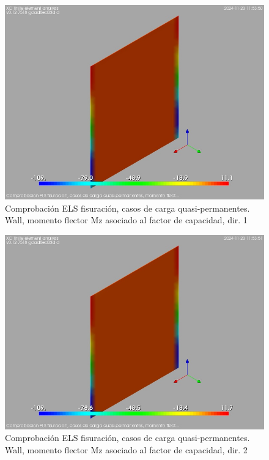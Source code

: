 \begin{figure}[ht]
\begin{center}
\includegraphics[width=\linewidth]{results/graphics/crackingSLS_qperm/wallMzSect1}
\caption{Comprobación ELS fisuración, casos de carga quasi-permanentes. Wall, momento flector Mz asociado al factor de capacidad, dir. 1}
\label{SLS_quasiPermanentLoadsCrackControlwallMzSect1}
\end{center}
\end{figure}
\begin{figure}[ht]
\begin{center}
\includegraphics[width=\linewidth]{results/graphics/crackingSLS_qperm/wallMzSect2}
\caption{Comprobación ELS fisuración, casos de carga quasi-permanentes. Wall, momento flector Mz asociado al factor de capacidad, dir. 2}
\label{SLS_quasiPermanentLoadsCrackControlwallMzSect2}
\end{center}
\end{figure}
